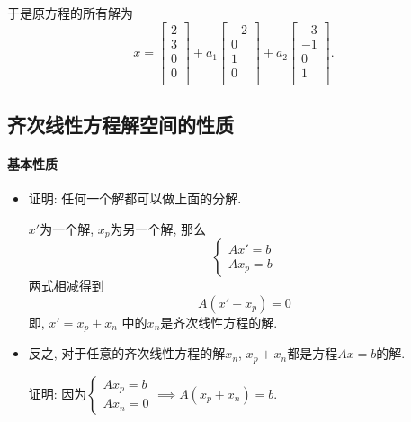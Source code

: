 \begin{itemize}
\begin{enumerate}
\begin{example}
            于是原方程的所有解为
            \begin{equation}
              x = \begin{bmatrix}
               2\\
               3\\
               0\\
               0\\
              \end{bmatrix}
              + a_1 \begin{bmatrix}
                -2\\
                0\\
                1\\
                0\\
            \end{bmatrix}+ a_2 \begin{bmatrix}
                -3\\
                -1\\
                0\\
                1\\
            \end{bmatrix}.
        \end{equation}
    \end{example}
\end{enumerate}
\end{itemize}

\subsection{齐次线性方程解空间的性质}
\paragraph{基本性质}
\begin{itemize}
    \item 证明: 任何一个解都可以做上面的分解.

    $x'$为一个解, $x_p$为另一个解, 那么
    \begin{equation}
      \begin{cases} 
        Ax' = b
        \\ 
        A x_p = b 
      \end{cases}
    \end{equation}
    两式相减得到
    \begin{equation}
      A(x' -x_p)=0
    \end{equation}
    即, $x' = x_p +x_n$ 中的$x_n$是齐次线性方程的解.

    \item 反之, 对于任意的齐次线性方程的解$x_n$, $x_p + x_n$都是方程$Ax=b$的解.

    证明: 
    因为$\begin{cases} 
      A x_p=b 
      \\ 
      A x_n=0 
    \end{cases}
    \implies A(x_p+ x_n) = b$.
    
\end{itemize}

